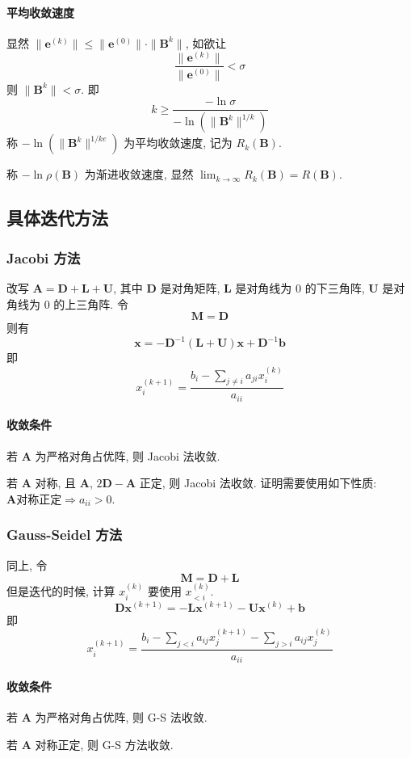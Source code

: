 \documentclass{ctexart}
\begin{document}
\paragraph{平均收敛速度}
    显然 $\|\mathbf{e}^{(k)}\| \le \|\mathbf{e}^{(0)}\| \cdot \|\mathbf{B}^k\|$, 如欲让 \[
        \frac{\|\mathbf{e}^{(k)}\|}{\|\mathbf{e}^{(0)}\|} < \sigma\]
    则 $ \|\mathbf{B}^k\| < \sigma$. 即 \[
        k \ge \frac{-\ln\sigma}{-\ln\left(\|\mathbf{B}^k\|^{1/k}\right)}\]
    称 $-\ln\left(\|\mathbf{B}^k\|^{1/ke}\right)$ 为平均收敛速度, 记为 $R_k(\mathbf{B})$.\par
    称 $-\ln\rho(\mathbf{B})$ 为渐进收敛速度, 显然 $\lim_{k\to\infty} R_k(\mathbf{B}) = R(\mathbf{B})$.
\subsection{具体迭代方法}
\subsubsection{Jacobi 方法}
    改写 $\mathbf{A} = \mathbf{D} + \mathbf{L} + \mathbf{U}$, 其中 $\mathbf{D}$ 是对角矩阵,
    $\mathbf{L}$ 是对角线为 0 的下三角阵, $\mathbf{U}$ 是对角线为 0 的上三角阵.
    令 \[
        \mathbf{M} = \mathbf{D}\]
    则有 \[
        \mathbf{x} = - \mathbf{D}^{-1} (\mathbf{L} + \mathbf{U}) \mathbf{x} + \mathbf{D}^{-1} \mathbf{b}\]
    即 \[
        x^{(k+1)}_i = \frac{b_i - \sum_{j \neq i} a_{ji} x^{(k)}_i}{a_{ii}}\]
\paragraph{收敛条件}
    若 $\mathbf{A}$ 为严格对角占优阵, 则 Jacobi 法收敛.\par
    若 $\mathbf{A}$ 对称, 且 $\mathbf{A}$, $2 \mathbf{D} - \mathbf{A}$ 正定, 则 Jacobi 法收敛.
    证明需要使用如下性质: $\mathbf{A} \text{对称正定} \Rightarrow a_{ii} > 0$.
\subsubsection{Gauss-Seidel 方法}
    同上, 令 \[\mathbf{M} = \mathbf{D}+  \mathbf{L} \]
    但是迭代的时候, 计算 $x^{(k)}_i$ 要使用 $x^{(k)}_{<i}$. \[
        \mathbf{D} \mathbf{x}^{(k+1)} = - \mathbf{L} \mathbf{x}^{(k+1)} - \mathbf{U} \mathbf{x}^{(k)} + \mathbf{b}\]
    即 \[
        x^{(k+1)}_i = \frac{b_i - \sum_{j < i} a_{ij} x^{(k+1)}_j - \sum_{j > i} a_{ij} x^{(k)}_j}{a_{ii}}\]
\paragraph{收敛条件}
    若 $\mathbf{A}$ 为严格对角占优阵, 则 G-S 法收敛.\par
    若 $\mathbf{A}$ 对称正定, 则 G-S 方法收敛.
\end{document}
